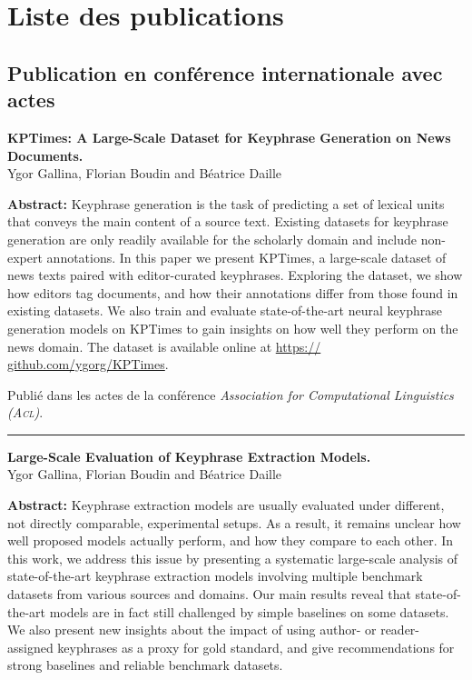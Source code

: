 \chapter*{Liste des publications}

\section*{Publication en conférence internationale avec actes}

\noindent
\textbf{KPTimes: A Large-Scale Dataset for Keyphrase Generation on News Documents.} \cite{gallina_kptimes_2019}\\
Ygor Gallina, Florian Boudin and Béatrice Daille%

\noindent
\textbf{Abstract:}
Keyphrase generation is the task of predicting a set of lexical units that conveys the main content of a source text. Existing datasets for keyphrase generation are only readily available for the scholarly domain and include non-expert annotations. In this paper we present KPTimes, a large-scale dataset of news texts paired with editor-curated keyphrases. Exploring the dataset, we show how editors tag documents, and how their annotations differ from those found in existing datasets. We also train and evaluate state-of-the-art neural keyphrase generation models on KPTimes to gain insights on how well they perform on the news domain. The dataset is available online at \url{https:// github.com/ygorg/KPTimes}.

\noindent
Publié dans les actes de la conférence \textit{Association for Computational Linguistics (\textsc{Acl})}.

\vspace{0.25cm}

\noindent\hfil\rule{0.5\textwidth}{.4pt}\hfil

\vspace{0.75cm}

\noindent
\textbf{Large-Scale Evaluation of Keyphrase Extraction Models.} \cite{gallina_large-scale_2020}\\
Ygor Gallina, Florian Boudin and Béatrice Daille%

\noindent
\textbf{Abstract:}
Keyphrase extraction models are usually evaluated under different, not directly comparable, experimental setups. As a result, it remains unclear how well proposed models actually perform, and how they compare to each other. In this work, we address this issue by presenting a systematic large-scale analysis of state-of-the-art keyphrase extraction models involving multiple benchmark datasets from various sources and domains. Our main results reveal that state-of-the-art models are in fact still challenged by simple baselines on some datasets. We also present new insights about the impact of using author- or reader-assigned keyphrases as a proxy for gold standard, and give recommendations for strong baselines and reliable benchmark datasets.

